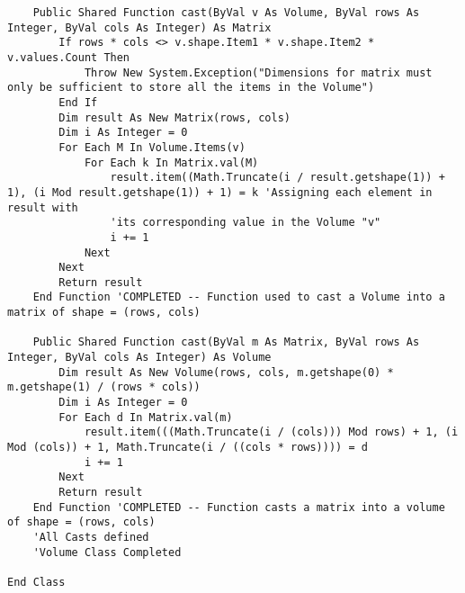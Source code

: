 \begin{verbatim}
    Public Shared Function cast(ByVal v As Volume, ByVal rows As Integer, ByVal cols As Integer) As Matrix
        If rows * cols <> v.shape.Item1 * v.shape.Item2 * v.values.Count Then
            Throw New System.Exception("Dimensions for matrix must only be sufficient to store all the items in the Volume")
        End If
        Dim result As New Matrix(rows, cols)
        Dim i As Integer = 0
        For Each M In Volume.Items(v)
            For Each k In Matrix.val(M)
                result.item((Math.Truncate(i / result.getshape(1)) + 1), (i Mod result.getshape(1)) + 1) = k 'Assigning each element in result with 
                'its corresponding value in the Volume "v"
                i += 1
            Next
        Next
        Return result
    End Function 'COMPLETED -- Function used to cast a Volume into a matrix of shape = (rows, cols)

    Public Shared Function cast(ByVal m As Matrix, ByVal rows As Integer, ByVal cols As Integer) As Volume
        Dim result As New Volume(rows, cols, m.getshape(0) * m.getshape(1) / (rows * cols))
        Dim i As Integer = 0
        For Each d In Matrix.val(m)
            result.item(((Math.Truncate(i / (cols))) Mod rows) + 1, (i Mod (cols)) + 1, Math.Truncate(i / ((cols * rows)))) = d
            i += 1
        Next
        Return result
    End Function 'COMPLETED -- Function casts a matrix into a volume of shape = (rows, cols)
    'All Casts defined
    'Volume Class Completed

End Class

\end{verbatim}